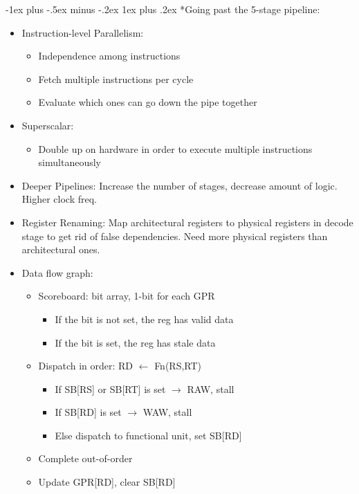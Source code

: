 \documentclass[landscape,10pt]{article}
\makeatletter
\renewcommand{\subsubsection}{\@startsection{subsubsection}{3}{0mm}%
            {-1ex plus -.5ex minus -.2ex}%
            {1ex plus .2ex}%
            {\normalfont\small\bfseries}}
\makeatother
\begin{document}
\begin{multicols}{2}
\subsubsection*{Going past the 5-stage pipeline:}
\begin{itemize}
    \item[] Instruction-level Parallelism:
    \begin{itemize}
        \item[] Independence among instructions
        \item[] Fetch multiple instructions per cycle
        \item[] Evaluate which ones can go down the pipe together
    \end{itemize}
    \item[] Superscalar:
    \begin{itemize}
        \item[] Double up on hardware in order to execute multiple instructions simultaneously
    \end{itemize}
    \item[] Deeper Pipelines: Increase the number of stages, decrease amount of logic. Higher clock freq.
    \item[] Register Renaming: Map architectural registers to physical registers in decode stage to get rid of false dependencies. Need more physical registers than architectural ones.
    \item[] Data flow graph:
    \begin{itemize}
        \item[] Scoreboard: bit array, 1-bit for each GPR
        \begin{itemize}
            \item[] If the bit is not set, the reg has valid data
            \item[] If the bit is set, the reg has stale data
        \end{itemize}
        \item[] Dispatch in order: RD \(\leftarrow\) Fn(RS,RT)
        \begin{itemize}
            \item[] If SB[RS] or SB[RT] is set \(\rightarrow\) RAW, stall
            \item[] If SB[RD] is set \(\rightarrow\) WAW, stall
            \item[] Else dispatch to functional unit, set SB[RD]
        \end{itemize}
        \item[] Complete out-of-order
        \item[] Update GPR[RD], clear SB[RD]
    \end{itemize}
\end{itemize}


\end{multicols}
\end{document}
